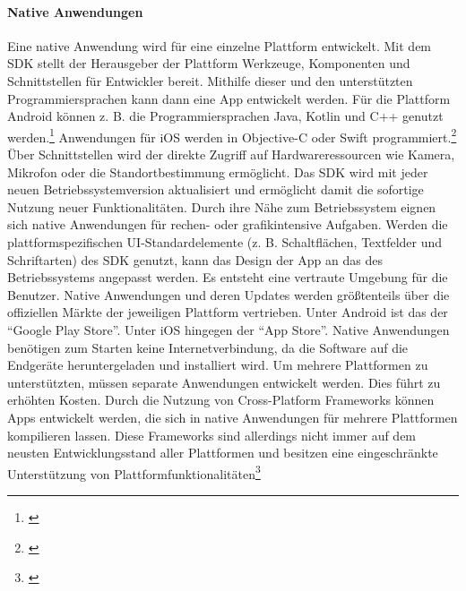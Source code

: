 \paragraph{Native Anwendungen}
Eine native Anwendung wird für eine einzelne Plattform entwickelt. Mit dem \gls{SDK} stellt der Herausgeber der Plattform Werkzeuge, Komponenten und Schnittstellen für Entwickler bereit. Mithilfe dieser und den unterstützten Programmiersprachen kann dann eine App entwickelt werden. Für die Plattform Android können z. B. die Programmiersprachen Java, Kotlin und C++ genutzt werden.\footnote{\cite[Vgl.][]{AndroidDocumentation2021a}} Anwendungen für iOS werden in Objective-C oder Swift programmiert.\footnote{\cite[Vgl.][]{SwiftDocumentation2021}} Über Schnittstellen wird der direkte Zugriff auf Hardwareressourcen wie Kamera, Mikrofon oder die Standortbestimmung ermöglicht. Das \gls{SDK} wird mit jeder neuen Betriebssystemversion aktualisiert und ermöglicht damit die sofortige Nutzung neuer Funktionalitäten. Durch ihre Nähe zum Betriebssystem eignen sich native Anwendungen für rechen- oder grafikintensive Aufgaben. Werden die plattformspezifischen \gls{UI}-Standardelemente (z. B. Schaltflächen, Textfelder und Schriftarten) des \gls{SDK} genutzt, kann das Design der App an das des Betriebssystems angepasst werden. Es entsteht eine vertraute Umgebung für die Benutzer. Native Anwendungen und deren Updates werden größtenteils über die offiziellen Märkte der jeweiligen Plattform vertrieben. Unter Android ist das der \enquote{Google Play Store}. Unter iOS hingegen der \enquote{App Store}. Native Anwendungen benötigen zum Starten keine Internetverbindung, da die Software auf die Endgeräte heruntergeladen und installiert wird. Um mehrere Plattformen zu unterstützten, müssen separate Anwendungen entwickelt werden. Dies führt zu erhöhten Kosten. Durch die Nutzung von Cross-Platform Frameworks können Apps entwickelt werden, die sich in native Anwendungen für mehrere Plattformen kompilieren lassen. Diese Frameworks sind allerdings nicht immer auf dem neusten Entwicklungsstand aller Plattformen und besitzen eine eingeschränkte Unterstützung von Plattformfunktionalitäten\footnote{\cite[Vgl.][]{XamarinDocumentation2021}}



